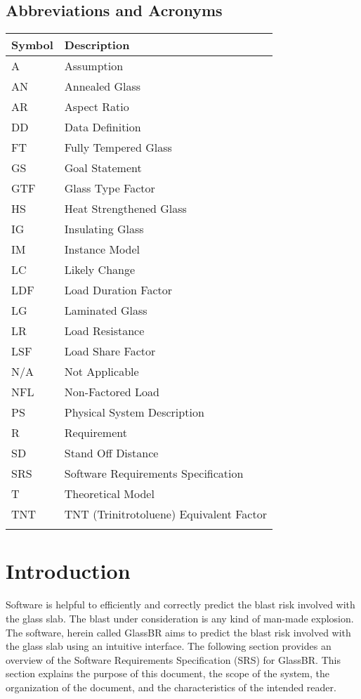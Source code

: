 \documentclass[12pt]{article}
\begin{document}
\subsection{Abbreviations and Acronyms}
\label{Sec:AbbrandAcro}
\begin{longtable*}{l l}
\toprule
Symbol & Description
\\
\midrule
A & Assumption
\\
AN & Annealed Glass
\\
AR & Aspect Ratio
\\
DD & Data Definition
\\
FT & Fully Tempered Glass
\\
GS & Goal Statement
\\
GTF & Glass Type Factor
\\
HS & Heat Strengthened Glass
\\
IG & Insulating Glass
\\
IM & Instance Model
\\
LC & Likely Change
\\
LDF & Load Duration Factor
\\
LG & Laminated Glass
\\
LR & Load Resistance
\\
LSF & Load Share Factor
\\
N/A & Not Applicable
\\
NFL & Non-Factored Load
\\
PS & Physical System Description
\\
R & Requirement
\\
SD & Stand Off Distance
\\
SRS & Software Requirements Specification
\\
T & Theoretical Model
\\
TNT & TNT (Trinitrotoluene) Equivalent Factor
\\
\bottomrule
\label{Table:AbbrandAcro}
\end{longtable*}
\section{Introduction}
\label{Sec:Intr}
Software is helpful to efficiently and correctly predict the blast risk involved with the glass slab. The blast under consideration is any kind of man-made explosion. The software, herein called GlassBR aims to predict the blast risk involved with the glass slab using an intuitive interface.
The following section provides an overview of the Software Requirements Specification (SRS) for GlassBR. This section explains the purpose of this document, the scope of the system, the organization of the document, and the characteristics of the intended reader.
\end{document}
